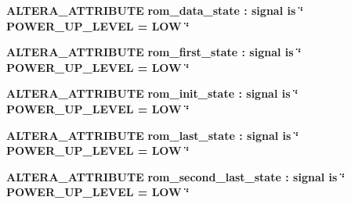 \begin{DoxyCompactItemize}
\item 
{\bf A\+L\+T\+E\+R\+A\+\_\+\+A\+T\+T\+R\+I\+B\+U\+TE} {\bfseries {\bfseries {\bf rom\+\_\+data\+\_\+state}} \textcolor{vhdlchar}{ }\textcolor{vhdlchar}{\+:}\textcolor{vhdlchar}{ }\textcolor{keywordflow}{signal}\textcolor{vhdlchar}{ }\textcolor{keywordflow}{is}\textcolor{vhdlchar}{ }\textcolor{vhdlchar}{ }\textcolor{vhdlchar}{ }\textcolor{vhdlchar}{ }\textcolor{keyword}{\char`\"{} P\+O\+W\+E\+R\+\_\+\+U\+P\+\_\+\+L\+E\+V\+E\+L = L\+O\+W \char`\"{}}\textcolor{vhdlchar}{ }} 
\item 
{\bf A\+L\+T\+E\+R\+A\+\_\+\+A\+T\+T\+R\+I\+B\+U\+TE} {\bfseries {\bfseries {\bf rom\+\_\+first\+\_\+state}} \textcolor{vhdlchar}{ }\textcolor{vhdlchar}{\+:}\textcolor{vhdlchar}{ }\textcolor{keywordflow}{signal}\textcolor{vhdlchar}{ }\textcolor{keywordflow}{is}\textcolor{vhdlchar}{ }\textcolor{vhdlchar}{ }\textcolor{vhdlchar}{ }\textcolor{vhdlchar}{ }\textcolor{keyword}{\char`\"{} P\+O\+W\+E\+R\+\_\+\+U\+P\+\_\+\+L\+E\+V\+E\+L = L\+O\+W \char`\"{}}\textcolor{vhdlchar}{ }} 
\item 
{\bf A\+L\+T\+E\+R\+A\+\_\+\+A\+T\+T\+R\+I\+B\+U\+TE} {\bfseries {\bfseries {\bf rom\+\_\+init\+\_\+state}} \textcolor{vhdlchar}{ }\textcolor{vhdlchar}{\+:}\textcolor{vhdlchar}{ }\textcolor{keywordflow}{signal}\textcolor{vhdlchar}{ }\textcolor{keywordflow}{is}\textcolor{vhdlchar}{ }\textcolor{vhdlchar}{ }\textcolor{vhdlchar}{ }\textcolor{vhdlchar}{ }\textcolor{keyword}{\char`\"{} P\+O\+W\+E\+R\+\_\+\+U\+P\+\_\+\+L\+E\+V\+E\+L = L\+O\+W \char`\"{}}\textcolor{vhdlchar}{ }} 
\item 
{\bf A\+L\+T\+E\+R\+A\+\_\+\+A\+T\+T\+R\+I\+B\+U\+TE} {\bfseries {\bfseries {\bf rom\+\_\+last\+\_\+state}} \textcolor{vhdlchar}{ }\textcolor{vhdlchar}{\+:}\textcolor{vhdlchar}{ }\textcolor{keywordflow}{signal}\textcolor{vhdlchar}{ }\textcolor{keywordflow}{is}\textcolor{vhdlchar}{ }\textcolor{vhdlchar}{ }\textcolor{vhdlchar}{ }\textcolor{vhdlchar}{ }\textcolor{keyword}{\char`\"{} P\+O\+W\+E\+R\+\_\+\+U\+P\+\_\+\+L\+E\+V\+E\+L = L\+O\+W \char`\"{}}\textcolor{vhdlchar}{ }} 
\item 
{\bf A\+L\+T\+E\+R\+A\+\_\+\+A\+T\+T\+R\+I\+B\+U\+TE} {\bfseries {\bfseries {\bf rom\+\_\+second\+\_\+last\+\_\+state}} \textcolor{vhdlchar}{ }\textcolor{vhdlchar}{\+:}\textcolor{vhdlchar}{ }\textcolor{keywordflow}{signal}\textcolor{vhdlchar}{ }\textcolor{keywordflow}{is}\textcolor{vhdlchar}{ }\textcolor{vhdlchar}{ }\textcolor{vhdlchar}{ }\textcolor{vhdlchar}{ }\textcolor{keyword}{\char`\"{} P\+O\+W\+E\+R\+\_\+\+U\+P\+\_\+\+L\+E\+V\+E\+L = L\+O\+W \char`\"{}}\textcolor{vhdlchar}{ }} 

\end{DoxyCompactItemize}
